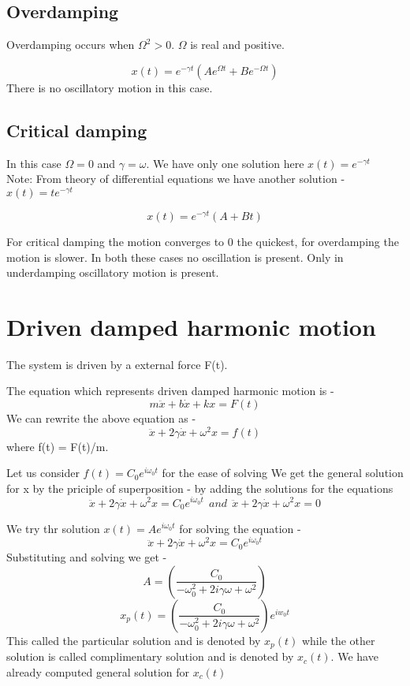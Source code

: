 \documentclass{book}
\begin{document}
\subsection{Overdamping}

Overdamping occurs when  \(\Omega^2 > 0\).  \(\Omega\) is real and positive.

\[ x(t)  = e^{-\gamma t}(Ae^{\Omega t} + Be^{-\Omega t}) \]
There is no oscillatory motion in this case.
\subsection{Critical damping}
In this case \(\Omega =0\) and \(\gamma = \omega\). We have only one solution here \( x(t) = e^{- \gamma t} \)\\

\noindent
Note: From theory of differential equations we have another solution - \( x(t) = t e^{ -\gamma t} \) 

\[ x(t) = e^{-\gamma t}( A + Bt) \]

For critical damping the motion converges to 0 the quickest, for overdamping the motion is slower. In both these cases no oscillation is present.
Only in underdamping oscillatory motion is present.



\section{Driven damped harmonic motion}
The system is driven by a external force F(t).

The equation which represents driven damped harmonic motion is -
\[ m\ddot{x} + b\dot{x} +kx = F(t)\]
We can rewrite the above equation as - 
\[ \ddot{x} + 2\gamma \dot{x} + \omega^2 x = f(t)\]
where f(t) = F(t)/m.


Let us consider \(f(t) = C_0e^{i\omega_0 t}\) for the ease of solving
We get the general solution for x by the priciple of superposition - by adding the solutions for the equations
\[ \ddot{x} + 2\gamma \dot{x} + \omega^2 x = C_0e^{i\omega_0 t} \ \ and \ \ \ddot{x} + 2\gamma \dot{x} + \omega^2 x = 0  \]

We try thr solution \(x(t) = Ae^{i\omega_0 t}\) for solving the equation - 
\[\ddot{x} + 2\gamma \dot{x} + \omega^2 x = C_0e^{i\omega_0 t}\]
Substituting and solving we get - 
\[ A = \left(\frac{C_0}{-\omega_0^2 + 2i\gamma \omega + \omega^2}\right) \]
\[ x_p(t) = \left(\frac{C_0}{-\omega_0^2 + 2i\gamma \omega + \omega^2}\right) e^{iw_0t}\]
This called the particular solution and is denoted by \(x_p(t)\) while the other solution is called
complimentary solution and is denoted by \(x_c(t)\). We have already computed general solution for \(x_c(t)\) 
\end{document}
